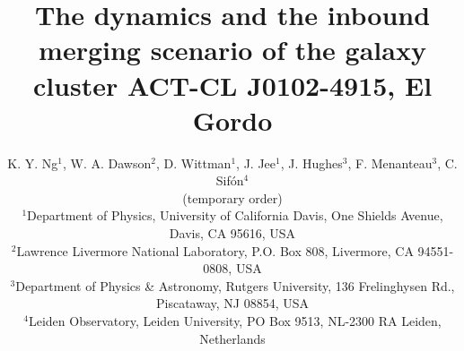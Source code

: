 

\title[The dynamics and merging scenario of ACT-CL J0102-4915, El
Gordo]{The dynamics and the inbound merging scenario of the galaxy cluster ACT-CL J0102-4915, El Gordo}
\author[K. Y. Ng et al.]{K. Y. Ng$^{1}$, W. A. Dawson$^{2}$, D. Wittman$^{1}$, J.
Jee$^{1}$, J. Hughes$^{3}$, F. Menanteau$^{3}$, C. Sif\'{o}n$^{4}$\\
(temporary order)\\
$^{1}$Department of Physics, University of California Davis, One Shields
Avenue, Davis, CA 95616, USA\\ 
$^{2}$Lawrence Livermore National Laboratory, P.O. Box 808, Livermore, CA 94551-0808, USA \\
$^3$Department of Physics \& Astronomy,
Rutgers University, 136 Frelinghysen Rd., Piscataway, NJ 08854, USA\\
$^{4}$Leiden Observatory, Leiden University, PO Box 9513, NL-2300 RA
Leiden, Netherlands\\}

